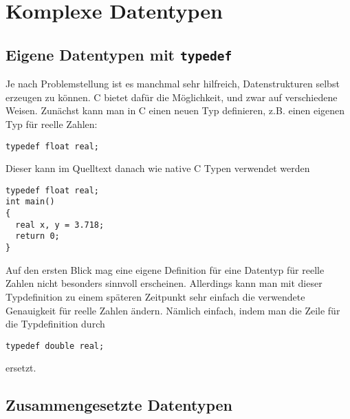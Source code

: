 \section{Komplexe Datentypen}

\subsection{Eigene Datentypen mit \texttt{typedef}}

Je nach Problemstellung ist es manchmal sehr hilfreich, Datenstrukturen selbst erzeugen zu können.
C bietet dafür die Möglichkeit, und zwar auf verschiedene Weisen.
Zunächst kann man in C einen neuen Typ definieren, z.B. einen eigenen Typ für reelle Zahlen:
\begin{lstlisting}
typedef float real;
\end{lstlisting}
Dieser kann im Quelltext danach wie native C Typen verwendet werden
\begin{lstlisting}
typedef float real;
int main()
{
  real x, y = 3.718;
  return 0;
}
\end{lstlisting}
Auf den ersten Blick mag eine eigene Definition für eine Datentyp für reelle Zahlen nicht besonders sinnvoll erscheinen.
Allerdings kann man mit dieser Typdefinition zu einem späteren Zeitpunkt sehr einfach die verwendete Genauigkeit für reelle Zahlen ändern.
Nämlich einfach, indem man die Zeile für die Typdefinition durch
\begin{lstlisting}
typedef double real;
\end{lstlisting}
ersetzt.

\subsection{Zusammengesetzte Datentypen}

